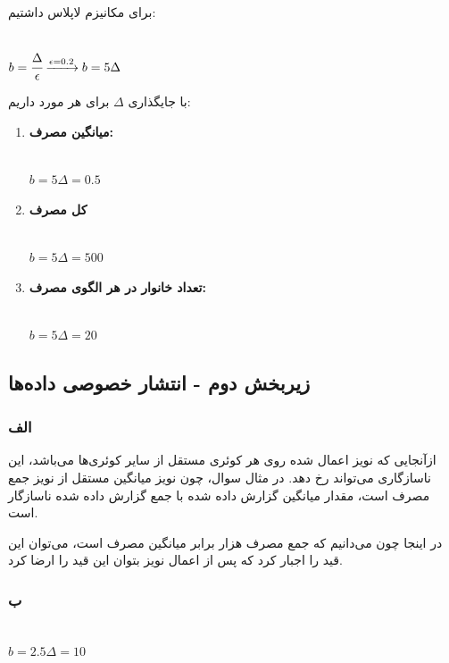 	برای مکانیزم لاپلاس داشتیم:
	\begin{latin}
		~\\
		$
		b = \cfrac{\Delta}{\epsilon} 
		\xrightarrow{\epsilon = 0.2} b = 5\Delta
		$
	\end{latin}
	با جایگذاری 
	$\Delta$
	برای هر مورد داریم:
	\begin{enumerate}
	\item 
	\textbf{میانگین مصرف:}
	\begin{latin}
		~\\
		$
		b = 5\Delta = 0.5
		$
	\end{latin}
	\item 
	\textbf{کل مصرف}

	\begin{latin}
		~\\
		$
b = 5\Delta = 500
		$
	\end{latin}
	\item 
	\textbf{تعداد خانوار در هر الگوی مصرف:}
\begin{latin}
	~\\
	$
	b = 5\Delta = 20
	$
\end{latin}
	
\end{enumerate}
\subsection{زیربخش دوم - انتشار خصوصی داده‌ها}
\subsubsection{الف}
ازآنجایی که نویز اعمال شده روی هر کوئری مستقل از سایر کوئری‌ها می‌باشد، این ناسازگاری می‌تواند رخ دهد. در مثال سوال، چون نویز میانگین مستقل از نویز جمع مصرف است، مقدار میانگین گزارش داده شده با جمع گزارش داده شده ناسازگار است.

در اینجا چون می‌دانیم که جمع مصرف هزار برابر میانگین مصرف است، می‌توان این قید را اجبار کرد که پس از اعمال نویز بتوان این قید را ارضا کرد. 
\subsubsection{ب}
\begin{latin}
	~\\
	$
	b = 2.5 \Delta = 10 
	$
\end{latin}
